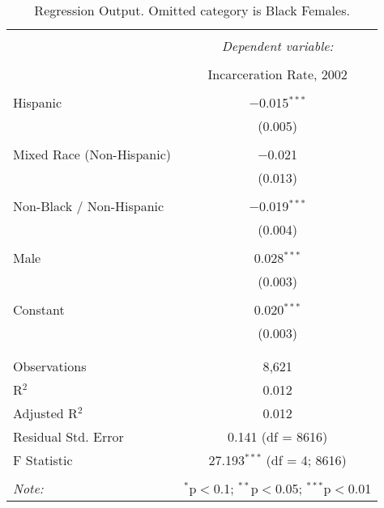 
\begin{table}[!htbp] \centering 
  \caption{Regression Output. Omitted category is Black Females.} 
  \label{tab:regression} 
\begin{tabular}{@{\extracolsep{5pt}}lc} 
\\[-1.8ex]\hline 
\hline \\[-1.8ex] 
 & \multicolumn{1}{c}{\textit{Dependent variable:}} \\ 
\cline{2-2} 
\\[-1.8ex] & Incarceration Rate, 2002 \\ 
\hline \\[-1.8ex] 
 Hispanic & $-$0.015$^{***}$ \\ 
  & (0.005) \\ 
  & \\ 
 Mixed Race (Non-Hispanic) & $-$0.021 \\ 
  & (0.013) \\ 
  & \\ 
 Non-Black / Non-Hispanic & $-$0.019$^{***}$ \\ 
  & (0.004) \\ 
  & \\ 
 Male & 0.028$^{***}$ \\ 
  & (0.003) \\ 
  & \\ 
 Constant & 0.020$^{***}$ \\ 
  & (0.003) \\ 
  & \\ 
\hline \\[-1.8ex] 
Observations & 8,621 \\ 
R$^{2}$ & 0.012 \\ 
Adjusted R$^{2}$ & 0.012 \\ 
Residual Std. Error & 0.141 (df = 8616) \\ 
F Statistic & 27.193$^{***}$ (df = 4; 8616) \\ 
\hline 
\hline \\[-1.8ex] 
\textit{Note:}  & \multicolumn{1}{r}{$^{*}$p$<$0.1; $^{**}$p$<$0.05; $^{***}$p$<$0.01} \\ 
\end{tabular} 
\end{table} 
